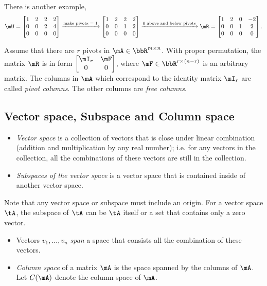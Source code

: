\documentclass[11pt]{article}
\theoremstyle{plain}
\theoremstyle{definition}
\begin{document}
There is another example,
\begin{align}
	\mU = \begin{bmatrix}
		1 &2&2&2\\0 &0 & 2 & 4\\ 0 & 0 & 0&0
	\end{bmatrix} \xrightarrow{\text{make pivots = 1}} \begin{bmatrix}
		1 &2&2&2\\0 &0 & 1 & 2\\ 0 & 0 & 0&0
	\end{bmatrix} 
	\xrightarrow{\text{0 above and below pivots}} \mR =  \begin{bmatrix}
		1 &2&0&-2\\0 &0 & 1 & 2\\ 0 & 0 & 0&0
	\end{bmatrix} .
\end{align}

Assume that there are $r$ pivots in $\mA \in \bbR^{m \times n}$. With proper permutation, the matrix $\mR$ is in form $\begin{bmatrix} \mI_r&\mF\\0 &0	\end{bmatrix}$, where $\mF \in \bbR^{ r \times (n-r)}$ is an arbitrary matrix. The columns in $\mA$ which correspond to the identity matrix $\mI_r$ are called \textit{pivot columns}. The other columns are \textit{free columns}.

\subsection{Vector space, Subspace and Column space}
\begin{itemize}
	\item \textit{Vector space} is a collection of vectors that is close under linear combination (addition and multiplication by any real number); i.e. for any vectors in the collection, all the combinations of these vectors are still in the collection.
	\item \textit{Subspaces of the vector space} is a vector space that is contained inside of another vector space.
\end{itemize}

Note that any vector space or subspace must include an origin. For a vector space $\tA$, the subspace of $\tA$ can be $\tA$ itself or a set that contains only a zero vector. 

\begin{itemize}
	\item Vectors $v_1 ,...,v_n$ \textit{span} a space that consists all the combination of these vectors. 
	\item \textit{Column space} of a matrix $\mA$ is the space spanned by the columns of $\mA$. Let $C(\mA)$ denote the column space of $\mA$.
\end{itemize}
\end{document}
